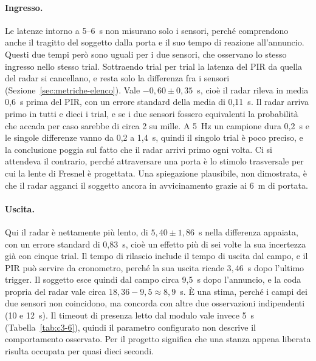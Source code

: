 \paragraph{Ingresso.} Le latenze intorno a 5--6~s non misurano solo i sensori, perché comprendono anche il tragitto del soggetto dalla porta e il suo tempo di reazione all'annuncio. Questi due tempi però sono uguali per i due sensori, che osservano lo stesso ingresso nello stesso trial. Sottraendo trial per trial la latenza del PIR da quella del radar si cancellano, e resta solo la differenza fra i sensori (Sezione~\ref{sec:metriche-elenco}). Vale $-0{,}60 \pm 0{,}35$~s, cioè il radar rileva in media 0,6~s prima del PIR, con un errore standard della media di 0,11~s. Il radar arriva primo in tutti e dieci i trial, e se i due sensori fossero equivalenti la probabilità che accada per caso sarebbe di circa 2 su mille. A 5~Hz un campione dura 0,2~s e le singole differenze vanno da 0,2 a 1,4~s, quindi il singolo trial è poco preciso, e la conclusione poggia sul fatto che il radar arrivi primo ogni volta. Ci si
attendeva il contrario, perché attraversare una porta è lo stimolo trasversale per
cui la lente di Fresnel è progettata. Una spiegazione plausibile, non dimostrata, è
che il radar agganci il soggetto ancora in avvicinamento grazie ai 6~m di portata.

\paragraph{Uscita.} Qui il radar è nettamente più lento, di $5{,}40 \pm 1{,}86$~s nella differenza appaiata, con un errore standard di 0,83~s, cioè un effetto più di sei volte la sua incertezza già con cinque trial. Il
tempo di rilascio include il tempo di uscita dal campo, e il PIR può servire da
cronometro, perché la sua uscita ricade $3{,}46$~s dopo l'ultimo trigger. Il soggetto esce
quindi dal campo circa 9,5~s dopo l'annuncio, e la coda propria del radar vale circa
$18{,}36 - 9{,}5 \approx 8{,}9$~s. È una stima, perché i campi dei due sensori non
coincidono, ma concorda con altre due osservazioni indipendenti (10 e 12~s). Il
timeout di presenza letto dal modulo vale invece 5~s (Tabella~\ref{tab:c3-6}), quindi
il parametro configurato non descrive il comportamento osservato. Per il progetto
significa che una stanza appena liberata risulta occupata per quasi dieci secondi.

